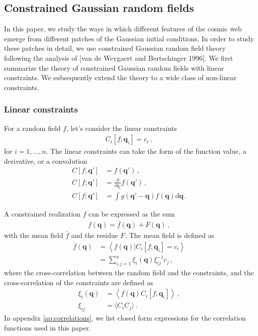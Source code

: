 \documentclass[a4paper, 11pt]{article}
\begin{document}
\subsection{Constrained Gaussian random fields}\label{sec:ConstrainedGRFs}
In this paper, we study the ways in which different features of the cosmic web emerge from different patches of the Gaussian initial conditions. In order to study these patches in detail, we use constrained Gaussian random field theory following the analysis of [van de Weygaert and Bertschinger 1996]. We first summarize the theory of constrained Gaussian random fields with linear constraints. We subsequently extend the theory to a wide class of non-linear constraints.

\subsubsection{Linear constraints}
For a random field $f$, let's consider the linear constraints
\begin{align}
C_i[f;\bm{q}_i] = c_i\,,
\end{align}
for $i=1,\dots,n$. The linear constraints can take the form of the function value, a derivative, or a convolution
\begin{align}
C[f;\bm{q}'] &= f(\bm{q}')\,,\\
C[f;\bm{q}'] &= \frac{\partial}{\partial q_i}f(\bm{q}')\,,\\
C[f;\bm{q}'] &= \int g(\bm{q}' - \bm{q})f(\bm{q})\mathrm{d}\bm{q}\,.
\end{align}

A constrained realization $f$ can be expressed as the sum
\begin{align}
f(\bm{q}) = \bar{f}(\bm{q}) + F(\bm{q})\,,
\end{align}
with the mean field $\bar{f}$ and the residue $F$. The mean field is defined as
\begin{align}
\bar{f}(\bm{q}) 
&= \left\langle f(\bm{q})|C_i[f;\bm{q}_i]=c_i \right\rangle\nonumber\\
&= \sum_{i,j=1}^n \xi_i(\bm{q}) \xi^{-1}_{ij} c_j\,,
\end{align}
where the cross-correlation between the random field and the constraints, and the cross-correlation of the constraints are defined as
\begin{align}
\xi_i(\bm{q}) &= \left\langle f(\bm{q}) C_i[f;\bm{q}_i]\right\rangle\,,\\
\xi_{ij} &= \langle C_i C_j \rangle\,.
\end{align}
In appendix \ref{ap:correlations}, we list closed form expressions for the correlation functions used in this paper. 
\end{document}
